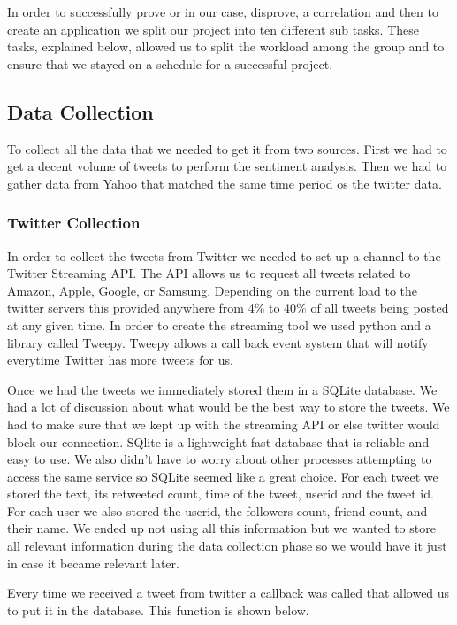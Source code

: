 \documentclass{acm_proc_article-sp}
\begin{document}
In order to successfully prove or in our case, disprove, a correlation and then
to create an application we split our project into ten different sub tasks.
These tasks, explained below, allowed us to split the workload among the group
and to ensure that we stayed on a schedule for a successful project.

\subsection{Data Collection} 

To collect all the data that we needed to get it from two sources.
First we had to get a decent volume of tweets to perform the sentiment
analysis. Then we had to gather data from Yahoo that matched the same time
period os the twitter data.

\subsubsection{Twitter Collection} 

In order to collect the tweets from Twitter we needed to set up a channel to
the Twitter Streaming API. The API allows us to request all tweets related to
Amazon, Apple, Google, or Samsung. Depending on the current load to the twitter
servers this provided anywhere from 4\% to 40\% of all tweets being posted at
any given time. In order to create the streaming tool we used python and a library
called Tweepy. Tweepy allows a call back event system that will notify everytime
Twitter has more tweets for us. 

Once we had the tweets we immediately stored them in a SQLite database.  We had
a lot of discussion about what would be the best way to store the tweets. We
had to make sure that we kept up with the streaming API or else twitter would
block our connection. SQlite is a lightweight fast database that is reliable
and easy to use. We also didn't have to worry about other processes attempting
to access the same service so SQLite seemed like a great choice. For each tweet
we stored the text, its retweeted count, time of the tweet, userid and the
tweet id. For each user we also stored the userid, the followers count, friend
count, and their name. We ended up not using all this information but we wanted
to store all relevant information during the data collection phase so we would
have it just in case it became relevant later. 

Every time we received a tweet from twitter a callback was called that allowed
us to put it in the database. This function is shown below.
\end{document}

